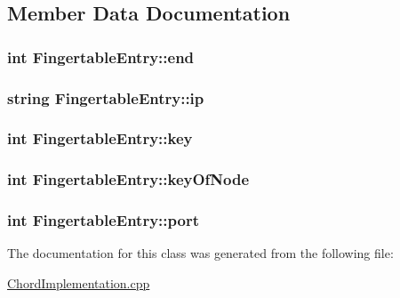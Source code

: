 \subsection{Member Data Documentation}
\hypertarget{class_fingertable_entry_adc6c7d257b25b5da177b8520ab0c4421}{
\subsubsection[{end}]{\setlength{\rightskip}{0pt plus 5cm}int Fingertable\+Entry\+::end}}\label{class_fingertable_entry_adc6c7d257b25b5da177b8520ab0c4421}
\hypertarget{class_fingertable_entry_aba9999324fb31f0b28dfae67e42141f3}{
\subsubsection[{ip}]{\setlength{\rightskip}{0pt plus 5cm}string Fingertable\+Entry\+::ip}}\label{class_fingertable_entry_aba9999324fb31f0b28dfae67e42141f3}
\hypertarget{class_fingertable_entry_aca47f1508456ffa9c0f2db89f75b4e69}{
\subsubsection[{key}]{\setlength{\rightskip}{0pt plus 5cm}int Fingertable\+Entry\+::key}}\label{class_fingertable_entry_aca47f1508456ffa9c0f2db89f75b4e69}
\hypertarget{class_fingertable_entry_a75aa0df50a020917beac27ead68738d1}{
\subsubsection[{key\+Of\+Node}]{\setlength{\rightskip}{0pt plus 5cm}int Fingertable\+Entry\+::key\+Of\+Node}}\label{class_fingertable_entry_a75aa0df50a020917beac27ead68738d1}
\hypertarget{class_fingertable_entry_a9c24b7b360327b88b71e6cd44d662e55}{
\subsubsection[{port}]{\setlength{\rightskip}{0pt plus 5cm}int Fingertable\+Entry\+::port}}\label{class_fingertable_entry_a9c24b7b360327b88b71e6cd44d662e55}


The documentation for this class was generated from the following file\+:\begin{DoxyCompactItemize}
\item 
\hyperlink{_chord_implementation_8cpp}{Chord\+Implementation.\+cpp}\end{DoxyCompactItemize}
